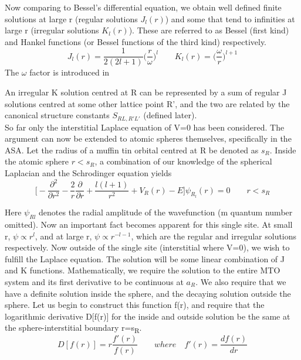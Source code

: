 \documentclass[12pt]{article}
\begin{document}
Now comparing to Bessel's differential equation, we obtain well defined finite solutions at large r (regular solutions $J_l(r)$) and some that tend to infinities at large r (irregular solutions $K_l(r)$). These are referred to as Bessel (first kind) and Hankel functions (or Bessel functions of the third kind) respectively. 
\begin{equation} \label{3.4} \tag{3.4}
J_l(r)=\frac{1}{2(2l+1)}\bigg(\frac{r}{\omega}\bigg)^l \qquad K_l(r)=\bigg(\frac{\omega}{r}\bigg)^{l+1}
\end{equation}
The $\omega$ factor is introduced in \cite{andersen} 

An irregular K solution centred at R can be represented by a sum of regular J solutions centred at some other lattice point R', and the two are related by the canonical structure constants $S_{RL,R'L'}$ (defined later).
\\
So far only the interstitial Laplace equation of V=0 has been considered. The argument can now be extended to atomic spheres themselves, specifically in the ASA. Let the radius of a muffin tin orbital centred at R be denoted as $s_R$. Inside the atomic sphere $r<s_R$, a combination of our knowledge of the spherical Laplacian and the Schrodinger equation yields
\begin{equation} \label{3.5} \tag{3.5}
\bigg[-\frac{\partial^2}{\partial r^2}-\frac{2}{r}\frac{\partial}{\partial r}+\frac{l(l+1)}{r^2}+V_R(r)-E \bigg] \psi_R_l(r)=0 \qquad r<s_R
\end{equation}

Here $\psi_{Rl}$ denotes the radial amplitude of the wavefunction (m quantum number omitted). Now an important fact becomes apparent for this single site. At small r, $\psi \propto r^l$, and at large r, $\psi \propto r^{-l-1}$, which are the regular and irregular solutions respectively. Now outside of the single site (interstitial where V=0), we wish to fulfill the Laplace equation. The solution will be some linear combination of J and K functions. Mathematically, we require the solution to the entire MTO system and its first derivative to be continuous at $a_R$. We also require that we have a definite solution inside the sphere, and the decaying solution outside the sphere. Let us begin to construct this function f(r), and require that the logarithmic derivative D[f(r)] for the inside and outside solution be the same at the sphere-interstitial boundary r=s\textsubscript{R}. 
\begin{equation} \label{3.6} \tag{3.6}
D[f(r)]= r \frac{f'(r)}{f(r)} \qquad where \quad f'(r)=\frac{df(r)}{dr}
\end{equation}
\end{document}
